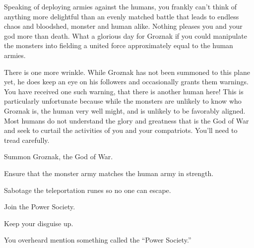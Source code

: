 \documentclass[char]{guildcamp2}
\begin{document}
Speaking of deploying armies against the humans, you frankly can't think of anything more delightful than an evenly matched battle that leads to endless chaos and bloodshed, monster and human alike. Nothing pleases you and your god more than death. What a glorious day for Groznak if you could manipulate the monsters into fielding a united force approximately equal to the human armies.

There is one more wrinkle. While Groznak has not been summoned to this plane yet, he does keep an eye on his followers and occasionally grants them warnings. You have received one such warning, that there is another human here! This is particularly unfortunate because while the monsters are unlikely to know who Groznak is, the human very well might, and is unlikely to be favorably aligned. Most humans do not understand the glory and greatness that is the God of War and seek to curtail the activities of you and your compatriots. You'll need to tread carefully.

\begin{itemz}[Goals]
	\item Summon Groznak, the God of War.
	\item Ensure that the monster army matches the human army in strength.
	\item Sabotage the teleportation runes so no one can escape.
	\item Join the Power Society.
  \item Keep your disguise up.
\end{itemz}


\begin{contacts}
	\contact{\cMinotaur{}} You overheard \cMinotaur{\them} mention something called the ``Power Society.''
\end{contacts}
\end{document}
